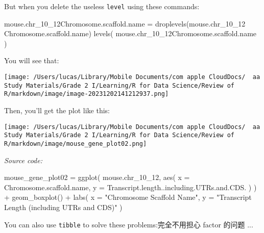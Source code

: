 \documentclass[
]{article}
\let\oldincludegraphics\includegraphics
\renewcommand{\includegraphics}[2][]{\begin{center}\oldincludegraphics[#1]{#2}\end{center}}
\newenvironment{Shaded}{}{}
\newcommand{\AttributeTok}[1]{\textcolor[rgb]{0.49,0.56,0.16}{#1}}
\newcommand{\FunctionTok}[1]{\textcolor[rgb]{0.02,0.16,0.49}{#1}}
\newcommand{\NormalTok}[1]{#1}
\newcommand{\OtherTok}[1]{\textcolor[rgb]{0.00,0.44,0.13}{#1}}
\newcommand{\SpecialCharTok}[1]{\textcolor[rgb]{0.25,0.44,0.63}{#1}}
\newcommand{\StringTok}[1]{\textcolor[rgb]{0.25,0.44,0.63}{#1}}
\begin{document}
But when you delete the useless \texttt{level} using these commands:

\begin{Shaded}
\begin{Highlighting}[]
\NormalTok{mouse.chr\_10\_12}\SpecialCharTok{$$}\NormalTok{Chromosome.scaffold.name }\OtherTok{=}
  \FunctionTok{droplevels}\NormalTok{(mouse.chr\_10\_12}\SpecialCharTok{$$}\NormalTok{Chromosome.scaffold.name)}
\FunctionTok{levels}\NormalTok{( mouse.chr\_10\_12}\SpecialCharTok{$$}\NormalTok{Chromosome.scaffold.name )}
\end{Highlighting}
\end{Shaded}

You will see that:

\texttt{[image: /Users/lucas/Library/Mobile Documents/com~apple~CloudDocs/~~aa Study Materials/Grade 2 I/Learning/R for Data Science/Review of R/markdown/image/image-20231202141212937.png]}

Then, you'll get the plot like this:

\texttt{[image: /Users/lucas/Library/Mobile Documents/com~apple~CloudDocs/~~aa Study Materials/Grade 2 I/Learning/R for Data Science/Review of R/markdown/image/mouse\_gene\_plot02.png]}

\emph{Source code:}

\begin{Shaded}
\begin{Highlighting}[]
\NormalTok{mouse\_gene\_plot02 }\OtherTok{=}
  \FunctionTok{ggplot}\NormalTok{(}
\NormalTok{    mouse.chr\_10\_12,}
    \FunctionTok{aes}\NormalTok{(}
      \AttributeTok{x =}\NormalTok{ Chromosome.scaffold.name,}
      \AttributeTok{y =}\NormalTok{ Transcript.length..including.UTRs.and.CDS.}
\NormalTok{    )}
\NormalTok{  ) }\SpecialCharTok{+}
  \FunctionTok{geom\_boxplot}\NormalTok{() }\SpecialCharTok{+}
  \FunctionTok{labs}\NormalTok{(}
    \AttributeTok{x =} \StringTok{"Chromosome Scaffold Name"}\NormalTok{,}
    \AttributeTok{y =} \StringTok{"Transcript Length (including UTRs and CDS)"}
\NormalTok{  )}
\end{Highlighting}
\end{Shaded}

You can also use \texttt{tibble} to solve these problems:完全不用担心
factor 的问题 ...
\end{document}
